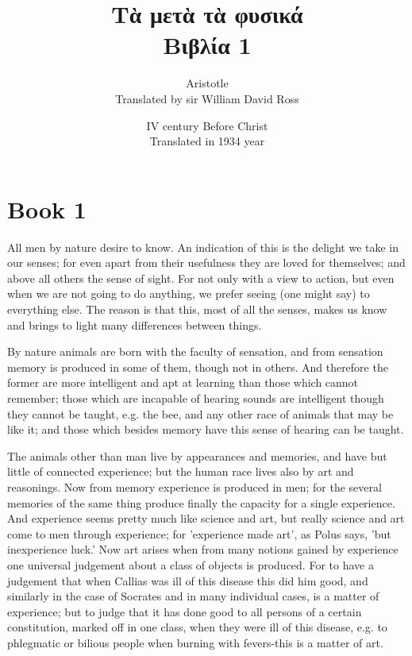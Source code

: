 \documentclass[oneside, 17pt, dvipsnames]{extbook}
\title{
    Τὰ μετὰ τὰ φυσικά
    \\
    Βιβλία 1
}
\author{
    Aristotle
    \\
    Translated by sir William David Ross
}
\date{
    IV century Before Christ
    \\
    Translated in 1934 year
}
\begin{document}
\maketitle
\tableofcontents

\section{Book 1}

All men by nature desire to know. An indication of this is the delight we take in our senses; for even apart from their usefulness they are loved for themselves; and above all others the sense of sight. For not only with a view to action, but even when we are not going to do anything, we prefer seeing (one might say) to everything else. The reason is that this, most of all the senses, makes us know and brings to light many differences between things.

By nature animals are born with the faculty of sensation, and from sensation memory is produced in some of them, though not in others. And therefore the former are more intelligent and apt at learning than those which cannot remember; those which are incapable of hearing sounds are intelligent though they cannot be taught, e.g. the bee, and any other race of animals that may be like it; and those which besides memory have this sense of hearing can be taught.

The animals other than man live by appearances and memories, and have but little of connected experience; but the human race lives also by art and reasonings. Now from memory experience is produced in men; for the several memories of the same thing produce finally the capacity for a single experience. And experience seems pretty much like science and art, but really science and art come to men through experience; for 'experience made art', as Polus says, 'but inexperience luck.' Now art arises when from many notions gained by experience one universal judgement about a class of objects is produced. For to have a judgement that when Callias was ill of this disease this did him good, and similarly in the case of Socrates and in many individual cases, is a matter of experience; but to judge that it has done good to all persons of a certain constitution, marked off in one class, when they were ill of this disease, e.g. to phlegmatic or bilious people when burning with fevers-this is a matter of art.
\end{document}
